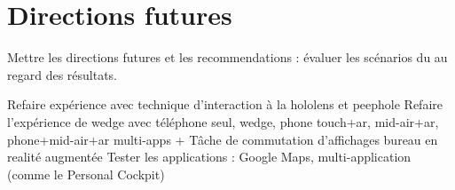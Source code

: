 \chapter{Directions futures}
\label{ch:futur_work}

Mettre les directions futures et les recommendations : évaluer les scénarios du  au regard des résultats.

Refaire expérience avec technique d'interaction à la hololens et peephole
Refaire l'expérience de wedge avec téléphone seul, wedge, phone touch+ar, mid-air+ar, phone+mid-air+ar
multi-apps + Tâche de commutation d'affichages
bureau en realité augmentée
Tester les applications : Google Maps, multi-application (comme le Personal Cockpit)